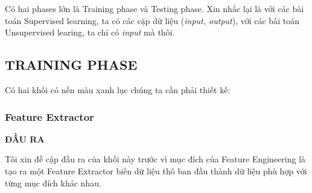 Có hai phases lớn là Training phase và Testing phase. Xin nhắc lại là với các bài toán Supervised learning, ta có các cặp dữ liệu (\textit{input, output}), với các bài toán Unsupervised learing, ta chỉ có \textit{input} mà thôi. 
  
 
\subsection{TRAINING PHASE }
Có hai khối có nền màu xanh lục chúng ta cần phải thiết kế:  
 
 
\subsubsection{Feature Extractor }
\textbf{ĐẦU RA} 
 
Tôi xin đề cập đầu ra của khối này trước vì mục đích của Feature Engineering là tạo ra một Feature Extractor biến dữ liệu thô ban đầu thành dữ liệu phù hợp với từng mục đích khác nhau.  
 
